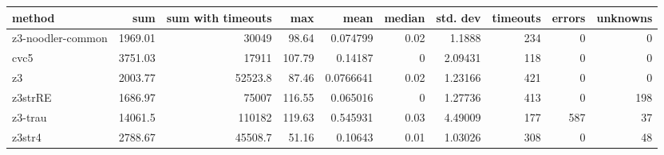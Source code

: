 \begin{tabular}{lrrrrrrrrr}
\hline
 method            &      sum &   sum with timeouts &    max &      mean &   median &   std. dev &   timeouts &   errors &   unknowns \\
\hline
 z3-noodler-common &  1969.01 &             30049   &  98.64 & 0.074799  &     0.02 &    1.1888  &        234 &        0 &          0 \\
 cvc5              &  3751.03 &             17911   & 107.79 & 0.14187   &     0    &    2.09431 &        118 &        0 &          0 \\
 z3                &  2003.77 &             52523.8 &  87.46 & 0.0766641 &     0.02 &    1.23166 &        421 &        0 &          0 \\
 z3strRE           &  1686.97 &             75007   & 116.55 & 0.065016  &     0    &    1.27736 &        413 &        0 &        198 \\
 z3-trau           & 14061.5  &            110182   & 119.63 & 0.545931  &     0.03 &    4.49009 &        177 &      587 &         37 \\
 z3str4            &  2788.67 &             45508.7 &  51.16 & 0.10643   &     0.01 &    1.03026 &        308 &        0 &         48 \\
\hline
\end{tabular}
